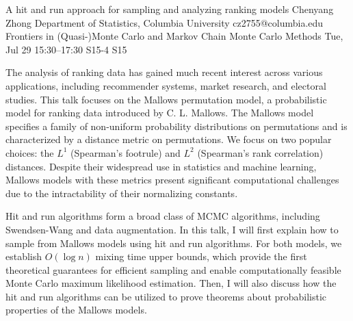 \begin{talk}
  {A hit and run approach for sampling and analyzing ranking models}%
  {Chenyang Zhong}%
  {Department of Statistics, Columbia University}%
  {cz2755@columbia.edu}%
  {Frontiers in (Quasi-)Monte Carlo and Markov Chain Monte Carlo Methods}%
  {}%
  {Tue, Jul 29 15:30–17:30}%
  {S15-4}%
  {S15}%
				
			
The analysis of ranking data has gained much recent interest across various applications, including recommender systems, market research, and electoral studies. This talk focuses on the Mallows permutation model, a probabilistic model for ranking data introduced by C. L. Mallows. The Mallows model specifies a family of non-uniform probability distributions on permutations and is characterized by a distance metric on permutations. We focus on two popular choices: the $L^1$ (Spearman’s footrule) and $L^2$ (Spearman’s rank correlation) distances. Despite their widespread use in statistics and machine learning, Mallows models with these metrics present significant computational challenges due to the intractability of their normalizing constants.

Hit and run algorithms form a broad class of MCMC algorithms, including Swendsen-Wang and data augmentation. In this talk, I will first explain how to sample from Mallows models using hit and run algorithms. For both models, we establish $O(\log n)$ mixing time upper bounds, which provide the first theoretical guarantees for efficient sampling and enable computationally feasible Monte Carlo maximum likelihood estimation. Then, I will also discuss how the hit and run algorithms can be utilized to prove theorems about probabilistic properties of the Mallows models.

\medskip


\end{talk}

